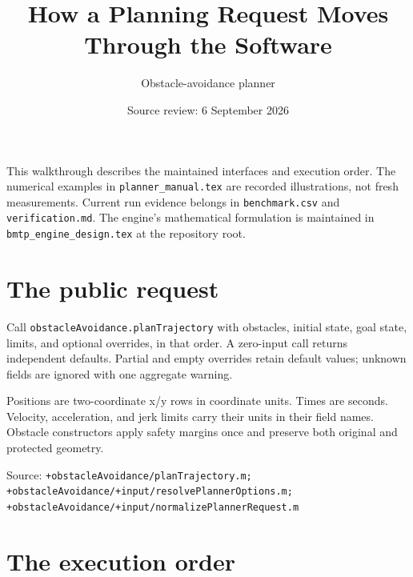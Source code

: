 \documentclass[10pt,letterpaper]{article}
\title{How a Planning Request Moves Through the Software}
\author{Obstacle-avoidance planner}
\date{Source review: 6 September 2026}
\newcommand{\source}[1]{\par{\footnotesize Source: \nolinkurl{#1}}\par}
\begin{document}
\maketitle

This walkthrough describes the maintained interfaces and execution order.
The numerical examples in \texttt{planner\_manual.tex} are recorded illustrations,
not fresh measurements. Current run evidence belongs in \texttt{benchmark.csv}
and \texttt{verification.md}. The engine's mathematical formulation is maintained
in \texttt{bmtp\_engine\_design.tex} at the repository root.

\section{The public request}

Call \texttt{obstacleAvoidance.planTrajectory} with obstacles, initial state,
goal state, limits, and optional overrides, in that order. A zero-input call
returns independent defaults. Partial and empty overrides retain default values;
unknown fields are ignored with one aggregate warning.

Positions are two-coordinate x/y rows in coordinate units. Times are
seconds. Velocity, acceleration, and jerk limits carry their units in their
field names. Obstacle constructors apply safety margins once and preserve both
original and protected geometry.
\source{+obstacleAvoidance/planTrajectory.m; +obstacleAvoidance/+input/resolvePlannerOptions.m; +obstacleAvoidance/+input/normalizePlannerRequest.m}

\section{The execution order}

\begin{center}
\end{center}
\end{document}
